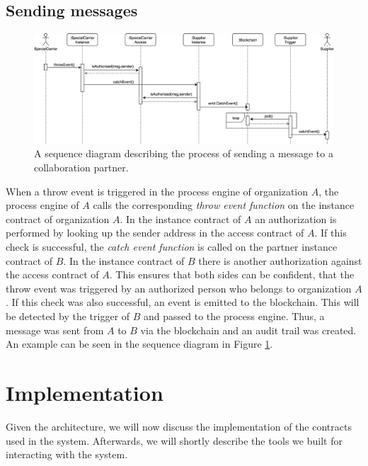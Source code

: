 \documentclass[runningheads]{llncs}
\begin{document}
\subsection{Sending messages}
\begin{figure}
	\centering
	\includegraphics[width=\textwidth]{fig/event_sending.eps}
	\caption{A sequence diagram describing the process of sending a message to a collaboration partner.}
	\label{fig:event_sending}
\end{figure}

When a throw event is triggered in the process engine of organization $A$, the process engine of $A$ calls the corresponding \emph{throw event function} on the instance contract of organization $A$.
In the instance contract of $A$ an authorization is performed by looking up the sender address in the access contract of $A$.
If this check is successful, the \emph{catch event function} is called on the partner instance contract of $B$.
In the instance contract of $B$ there is another authorization against the access contract of $A$.
This ensures that both sides can be confident, that the throw event was triggered by an authorized person who belongs to organization $A$.
If this check was also successful, an event is emitted to the blockchain.
This will be detected by the trigger of $B$ and passed to the process engine.
Thus, a message was sent from $A$ to $B$ via the blockchain and an audit trail was created.
An example can be seen in the sequence diagram in Figure \ref{fig:event_sending}.

\section{Implementation}

Given the architecture, we will now discuss the implementation of the contracts used in the system.
Afterwards, we will shortly describe the tools we built for interacting with the system.
\end{document}
